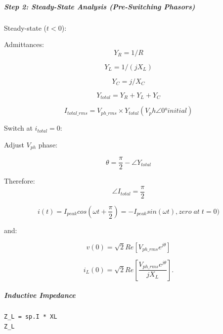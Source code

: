 \subparagraph{Step 2: Steady-State Analysis (Pre-Switching Phasors)}

Steady-state ($t<0$):

Admittances:
\begin{equation}
Y_R=1/R
\end{equation}

\begin{equation}
Y_L=1/(j X_L)
\end{equation}

\begin{equation}
Y_C=j/ X_C
\end{equation}

\begin{equation}
Y_{total} = Y_R + Y_L + Y_C
\end{equation}

\begin{equation}
I_{total\_rms} = V_{ph\_rms} \times Y_{total} \left(V_ph ∠0° initial\right)
\end{equation}

Switch at $i_{total}=0$:

Adjust $V_{ph}$ phase:

\begin{equation}
\theta = \frac{\pi}{2} - \angle{Y_{total}}
\end{equation}

Therefore:
\begin{equation}
\angle{I_{total}} = \frac{\pi}{2}
\end{equation}

\begin{equation}
i\left(t\right)=I_{peak} cos\left(\omega t + \frac{\pi}{2}\right) = -I_{peak} sin\left(\omega t\right), zero\;at\;t=0)
\end{equation}

and:

\begin{equation}
v\left(0\right) = \sqrt{2} Re\left[V_{ph\_rms} e^{jθ}\right]
\end{equation}

\begin{equation}
i_{L}\left(0\right) = \sqrt{2} Re\left[\frac{V_{ph\_rms} e^{jθ}}{j X_L}\right].
\end{equation}

\subparagraph{Inductive Impedance}

\begin{verbatim}
Z_L = sp.I * XL
Z_L
\end{verbatim}


